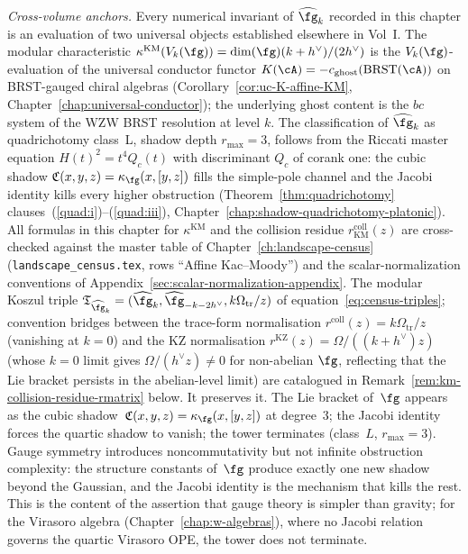 \medskip
\noindent\emph{Cross-volume anchors.}
Every numerical invariant of $\widehat{\fg}_k$ recorded in this
chapter is an evaluation of two universal objects established
elsewhere in Vol~I. The modular characteristic
\(
 \kappa^{\mathrm{KM}}(V_k(\fg)) = \dim(\fg)(k+h^\vee)/(2h^\vee)
\)
is the $V_k(\fg)$-evaluation of the universal conductor functor
$K(\cA) = -c_{\mathrm{ghost}}(\BRST(\cA))$ on
BRST-gauged chiral algebras
(Corollary~\ref{cor:uc-K-affine-KM},
Chapter~\ref{chap:universal-conductor}); the underlying ghost
content is the $bc$ system of the WZW BRST resolution at level $k$.
The classification of $\widehat{\fg}_k$ as quadrichotomy class~L,
shadow depth $r_{\max} = 3$, follows from the Riccati master
equation $H(t)^2 = t^4 Q_c(t)$ with discriminant
$Q_c$ of corank one: the cubic shadow
$\mathfrak{C}(x,y,z) = \kappa_{\fg}(x,[y,z])$
fills the simple-pole channel and the Jacobi identity kills
every higher obstruction
(Theorem~\ref{thm:quadrichotomy} clauses~(\ref{quad:i})--(\ref{quad:iii}),
Chapter~\ref{chap:shadow-quadrichotomy-platonic}).
All formulas in this chapter for $\kappa^{\mathrm{KM}}$ and the
collision residue $r^{\mathrm{coll}}_{\mathrm{KM}}(z)$ are cross-checked against
the master table of Chapter~\ref{ch:landscape-census}
(\texttt{landscape\_census.tex}, rows ``Affine Kac--Moody'') and the
scalar-normalization conventions of
Appendix~\ref{sec:scalar-normalization-appendix}.  The
modular Koszul triple
$\mathfrak{T}_{\widehat{\fg}_k} =
(\widehat{\fg}_k, \widehat{\fg}_{-k-2h^\vee}, k\Omega_{\mathrm{tr}}/z)$
of equation~\eqref{eq:census-triples}; convention bridges between the
trace-form normalisation $r^{\mathrm{coll}}(z) = k\Omega_{\mathrm{tr}}/z$
(vanishing at $k = 0$)
and the KZ normalisation $r^{\mathrm{KZ}}(z) = \Omega/((k+h^\vee)z)$ (whose
$k=0$ limit gives $\Omega/(h^\vee z) \neq 0$ for non-abelian $\fg$,
reflecting that the Lie bracket persists in the abelian-level
limit) are catalogued in Remark~\ref{rem:km-collision-residue-rmatrix} below.
\medskip
%
It preserves it. The Lie bracket of~$\fg$ appears as the
cubic shadow~$\mathfrak{C}(x,y,z) = \kappa_{\fg}(x,[y,z])$ at
degree~$3$; the Jacobi identity forces the quartic shadow to vanish;
the tower terminates (class~$L$, $r_{\max} = 3$). Gauge symmetry
introduces noncommutativity but not infinite obstruction complexity:
the structure constants of~$\fg$ produce exactly one new shadow
beyond the Gaussian, and the Jacobi identity is the mechanism that
kills the rest. This is the content of the assertion that gauge
theory is simpler than gravity; for the Virasoro algebra
(Chapter~\ref{chap:w-algebras}), where no Jacobi relation governs the
quartic Virasoro OPE, the tower does not terminate.

